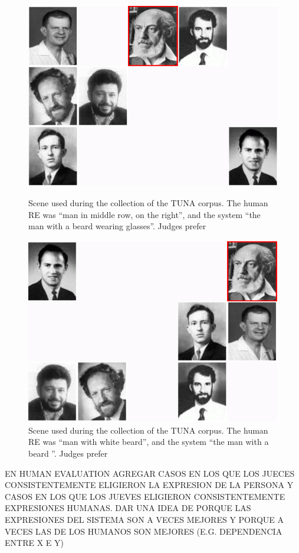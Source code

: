 \begin{figure}[ht]
\begin{minipage}{0.50\linewidth}
\centering
\includegraphics[width=\textwidth]{images/s28t25.png}
\caption{Scene used during the collection of the TUNA corpus. The human RE was ``man in middle row, on the right'', and the system ``the man with a beard wearing glasses''. Judges prefer}
\label{s28t25}
\end{minipage}
\begin{minipage}{0.50\linewidth}
\centering
\includegraphics[width=\textwidth]{images/s120t26.png}
\caption{Scene used during the collection of the TUNA corpus. The human RE was ``man with white beard'', and the system ``the man with a beard ''. Judges prefer}
\label{s307t21}
\end{minipage}
\end{figure}



EN HUMAN EVALUATION AGREGAR CASOS EN LOS QUE LOS JUECES CONSISTENTEMENTE ELIGIERON LA EXPRESION DE LA PERSONA Y CASOS EN LOS QUE LOS JUEVES ELIGIERON CONSISTENTEMENTE EXPRESIONES HUMANAS. DAR UNA IDEA DE PORQUE LAS EXPRESIONES DEL SISTEMA SON A VECES MEJORES Y PORQUE A VECES LAS DE LOS HUMANOS SON MEJORES (E.G. DEPENDENCIA ENTRE X E Y)
